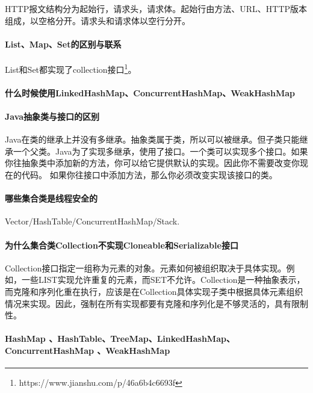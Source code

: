 \documentclass[../../../interview-questions.tex]{subfiles}
\begin{document}
HTTP报文结构分为起始行，请求头，请求体。起始行由方法、URL、HTTP版本组成，以空格分开。请求头和请求体以空行分开。


\paragraph{List、Map、Set的区别与联系}

List和Set都实现了collection接口\footnote{https://www.jianshu.com/p/46a6b4c6693f}。


\paragraph{什么时候使用LinkedHashMap、ConcurrentHashMap、WeakHashMap}

\paragraph{Java抽象类与接口的区别}

Java在类的继承上并没有多继承。抽象类属于类，所以可以被继承。但子类只能继承一个父类。Java为了实现多继承，使用了接口。一个类可以实现多个接口。如果你往抽象类中添加新的方法，你可以给它提供默认的实现。因此你不需要改变你现在的代码。 如果你往接口中添加方法，那么你必须改变实现该接口的类。

\paragraph{哪些集合类是线程安全的}

Vector/HashTable/ConcurrentHashMap/Stack.


\paragraph{为什么集合类Collection不实现Cloneable和Serializable接口}

Collection接口指定一组称为元素的对象。元素如何被组织取决于具体实现。例如，一些LIST实现允许重复的元素，而SET不允许。Collection是一种抽象表示，而克隆和序列化重在执行，应该是在Collection具体实现子类中根据具体元素组织情况来实现。因此，强制在所有实现都要有克隆和序列化是不够灵活的，具有限制性。


\paragraph{HashMap 、HashTable、TreeMap、LinkedHashMap、ConcurrentHashMap 、WeakHashMap}
\end{document}
